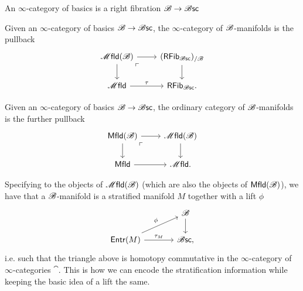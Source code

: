 \documentclass[../text]{subfiles}
\begin{document}
\begin{definition}
    An $\infty$-category of basics is a right fibration $\mathscr{B} \rightarrow \mathscr{B} \mathsf{sc}$
\end{definition}

\begin{definition}
    Given an $\infty$-category of basics $\mathscr{B} \rightarrow \mathscr{B} \mathsf{sc}$, the $\infty$-category of $\mathscr{B}$-manifolds is the pullback
    \begin{equation}
        \begin{tikzcd}
            \mfld(\bstr) \arrow[dr, phantom, "\ulcorner", very near start] \arrow[r] \arrow[d] & (\mathsf{RFib}_{\bsc})_{/\bstr} \arrow[d] \\
            \mfld \arrow[r, "\tau"] & \mathsf{RFib}_{\bsc}.
        \end{tikzcd}
    \end{equation}
\end{definition}

\begin{definition}
    Given an $\infty$-category of basics $\mathscr{B} \rightarrow \mathscr{B} \mathsf{sc}$, the ordinary category of $\mathscr{B}$-manifolds is the further pullback
    \begin{equation}
        \begin{tikzcd}
            \mfld[r](\bstr) \arrow[dr, phantom, "\ulcorner", very near start] \arrow[r] \arrow[d] & \mfld(\bstr) \arrow[d] \\
            \mfld[r] \arrow[r] & \mfld.
        \end{tikzcd}
    \end{equation}
\end{definition}

\begin{remark}
    Specifying to the objects of $\mfld(\bstr)$ (which are also the objects of $\mfld[r](\bstr)$), we have that a $\mathscr{B}$-manifold is a stratified manifold $M$ together with a lift $\phi$
    \begin{equation}
        \begin{tikzcd}[column sep = large]
            & \bstr \arrow[d] \\
            \mathsf{Entr}(M) \arrow[ru, "\phi"] \arrow[r, "\tau_M"] & \bsc,
        \end{tikzcd}
    \end{equation}
    i.e. such that the triangle above is homotopy commutative in the $\infty$-category of $\infty$-categories $\cat$. This is how we can encode the stratification information while keeping the basic idea of a lift the same.
\end{remark}
\end{document}
